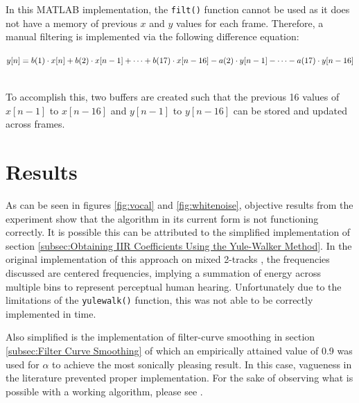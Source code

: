 \documentclass{article}
\begin{document}
In this MATLAB implementation, the \texttt{filt()} function cannot be used as it does not have a memory of previous $x$ and $y$ values for each frame.  Therefore, a manual filtering is implemented via the following difference equation:\\

\begin{multiline}
$y[n] = b(1) \cdot x[n] + b(2) \cdot x[n-1] + \cdots + b(17) \cdot x[n-16] - \\
a(2) \cdot y[n-1] - \cdots - a(17) \cdot y[n-16]$\\
\end{multiline}

\\To accomplish this, two buffers are created such that the previous 16 values of $x[n-1]$ to $x[n-16]$ and $y[n-1]$ to $y[n-16]$ can be stored and updated across frames.

\section{Results}
\label{sec:Results}

As can be seen in figures \ref{fig:vocal} and \ref{fig:whitenoise}, objective results from the experiment show that the algorithm in its current form is not functioning correctly.  It is possible this can be attributed to the simplified implementation of section \ref{subsec:Obtaining IIR Coefficients Using the Yule-Walker Method}.  In the original implementation of this approach on mixed 2-tracks \cite{ma2013implementation}, the frequencies discussed are centered frequencies, implying a summation of energy across multiple bins to represent perceptual human hearing.  Unfortunately due to the limitations of the \texttt{yulewalk()} function, this was not able to be correctly implemented in time.

Also simplified is the implementation of filter-curve smoothing in section \ref{subsec:Filter Curve Smoothing} of which an empirically attained value of 0.9 was used for $\alpha$ to achieve the most sonically pleasing result.  In this case, vagueness in the literature prevented proper implementation.  For the sake of observing what is possible with a working algorithm, please see \cite{ma2013implementation}.
\end{document}
